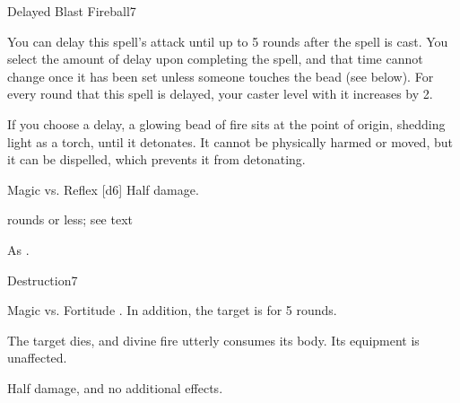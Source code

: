 \begin{spellsection}{Delayed Blast Fireball}{7}
\begin{spellheader}
\end{spellheader}
\begin{spellcontent}
    \begin{spelltargetinginfo}
    \end{spelltargetinginfo}
    \begin{spelleffects}
        \spellspecial You can delay this spell's attack until up to 5 rounds after the spell is cast. You select the amount of delay upon completing the spell, and that time cannot change once it has been set unless someone touches the bead (see below). For every round that this spell is delayed, your caster level with it increases by 2.
        
        If you choose a delay, a glowing bead of fire sits at the point of origin, shedding light as a torch, until it detonates. It cannot be physically harmed or moved, but it can be dispelled, which prevents it from detonating.
        \begin{spellattack}{Magic vs. Reflex}
            \spellsuccess {}[d6]
            \spellfailure Half damage.
        \end{spellattack}
         rounds or less; see text
    \end{spelleffects}
\end{spellcontent}
\begin{spellfooter}
    \spellnotes As .
\end{spellfooter}
\end{spellsection}

\begin{spellsection}{Destruction}{7}
\begin{spellheader}
\end{spellheader}
\begin{spellcontent}
    \begin{spelltargetinginfo}
    \end{spelltargetinginfo}
    \begin{spelleffects}
        \begin{spellattack}{Magic vs. Fortitude}
            \spellsuccess {}. In addition, the target is \staggered for 5 rounds.

            \spellcritical The target dies, and divine fire utterly consumes its body. Its equipment is unaffected.

            \spellfailure Half damage, and no additional effects.
        \end{spellattack}
    \end{spelleffects}
\end{spellcontent}
\begin{spellfooter}
\end{spellfooter}
\end{spellsection}

